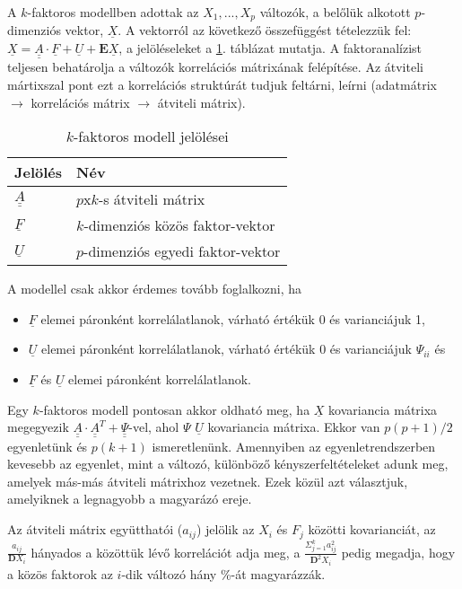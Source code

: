 A $k$-faktoros modellben adottak az $X_1, ..., X_p$ változók, a belőlük alkotott $p$-dimenziós vektor, $\underline{X}$. A vektorról az következő összefüggést tételezzük fel: $\underline{X} = \underline{\underline{A}} \cdot \underline{F} + \underline{U} + \mathbf{E}\underline{X}$, a jelöléseleket a \ref{fig:k-modell}. táblázat mutatja. A faktoranalízist teljesen behatárolja a változók korrelációs mátrixának felépítése. Az átviteli mártixszal pont ezt a korrelációs struktúrát tudjuk feltárni, leírni (adatmátrix $\rightarrow$ korrelációs mátrix $\rightarrow$ átviteli mátrix).

\begin{table}[h]
\centering
\caption{$k$-faktoros modell jelölései} \label{fig:k-modell}
\begin{tabular}{|l|l|}
\hline
Jelölés & Név
\\ \hline
$\underline{\underline{A}}$ & $p$x$k$-s átviteli mátrix
\\ \hline
$\underline{F}$ & $k$-dimenziós közös faktor-vektor
\\ \hline
$\underline{U}$ & $p$-dimenziós egyedi faktor-vektor
\\ \hline
\end{tabular}
\end{table}

A modellel csak akkor érdemes tovább foglalkozni, ha
\begin{itemize}
\item $\underline{F}$ elemei páronként korrelálatlanok, várható értékük 0 és varianciájuk 1,
\item $\underline{U}$ elemei páronként korrelálatlanok, várható értékük 0 és varianciájuk $\Psi_{ii}$ és
\item $\underline{F}$ és $\underline{U}$ elemei páronként korrelálatlanok.
\end{itemize}

Egy $k$-faktoros modell pontosan akkor oldható meg, ha $\underline{X}$ kovariancia mátrixa megegyezik $\underline{\underline{A}} \cdot \underline{\underline{A}}^T +\underline{\underline{\Psi}}$-vel, ahol $\Psi$ $\underline{U}$ kovariancia mátrixa. Ekkor van $p(p+1)/2$ egyenletünk és $p(k+1)$ ismeretlenünk. Amennyiben az egyenletrendszerben kevesebb az egyenlet, mint a változó, különböző kényszerfeltételeket adunk meg, amelyek más-más átviteli mátrixhoz vezetnek. Ezek közül azt választjuk, amelyiknek a legnagyobb a magyarázó ereje.

Az átviteli mátrix együtthatói ($a_{ij}$) jelölik az $X_i$ és $F_j$ közötti kovarianciát, az $\frac{a_{ij}}{\mathbf{D}X_i}$ hányados a közöttük lévő korrelációt adja meg, a $\frac{\Sigma_{j=1}^k a^2_{ij}}{\mathbf{D}^2X_i}$ pedig megadja, hogy a közös faktorok az $i$-dik változó hány \%-át magyarázzák.

